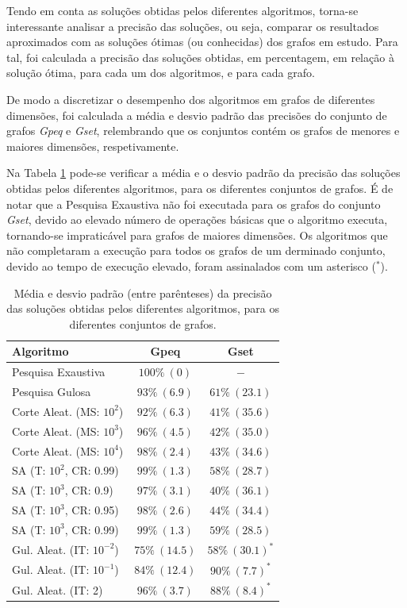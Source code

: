 \documentclass[mirror, portugues]{revdetua}
\begin{document}
Tendo em conta as soluções obtidas pelos diferentes algoritmos, torna-se interessante analisar a precisão das soluções, ou seja, comparar os resultados aproximados com as soluções ótimas (ou conhecidas) dos grafos em estudo. Para tal, foi calculada a precisão das soluções obtidas, em percentagem, em relação à solução ótima, para cada um dos algoritmos, e para cada grafo.

De modo a discretizar o desempenho dos algoritmos em grafos de diferentes dimensões, foi calculada a média e desvio padrão das precisões do conjunto de grafos \textit{Gpeq} e \textit{Gset}, relembrando que os conjuntos contém os grafos de menores e maiores dimensões, respetivamente.

Na Tabela \ref{table:precision} pode-se verificar a média e o desvio padrão da precisão das soluções obtidas pelos diferentes algoritmos, para os diferentes conjuntos de grafos. É de notar que a Pesquisa Exaustiva não foi executada para os grafos do conjunto \textit{Gset}, devido ao elevado número de operações básicas que o algoritmo executa, tornando-se impraticável para grafos de maiores dimensões. Os algoritmos que não completaram a execução para todos os grafos de um derminado conjunto, devido ao tempo de execução elevado, foram assinalados com um asterisco ($^*$).


\begin{table}[H]
\centering
\caption{Média e desvio padrão (entre parênteses) da precisão das soluções obtidas pelos diferentes algoritmos, para os diferentes conjuntos de grafos.}
\label{table:precision}
\begin{tabular}{lcc}
\toprule
\textbf{Algoritmo} & \textbf{Gpeq} & \textbf{Gset} \\
\midrule
Pesquisa Exaustiva & $100\% \ (0)$ & $-$ \\
Pesquisa Gulosa & $93\% \ (6.9)$ & $61\% \ (23.1)$ \\
Corte Aleat. (MS: $10^2$) & $92\% \ (6.3)$ & $41\% \ (35.6)$ \\
Corte Aleat. (MS: $10^3$) & $96\% \ (4.5)$ & $42\% \ (35.0)$ \\
Corte Aleat. (MS: $10^4$) & $98\% \ (2.4)$ & $43\% \ (34.6)$ \\
SA (T: $10^2$, CR: 0.99) & $99\% \ (1.3)$ & $58\% \ (28.7)$ \\
SA (T: $10^3$, CR: 0.9) & $97\% \ (3.1)$ & $40\% \ (36.1)$ \\
SA (T: $10^3$, CR: 0.95) & $98\% \ (2.6)$ & $44\% \ (34.4)$ \\
SA (T: $10^3$, CR: 0.99) & $99\% \ (1.3)$ & $59\% \ (28.5)$ \\
Gul. Aleat. (IT: $10^{-2}$) & $75\% \ (14.5)$ & $58\% \ (30.1)^*$\\
Gul. Aleat. (IT: $10^{-1}$) & $84\% \ (12.4)$ & $90\% \ (7.7)^*$\\
Gul. Aleat. (IT: 2) & $96\% \ (3.7)$ & $88\% \ (8.4)^*$ \\
\bottomrule
\end{tabular}
\end{table}
\end{document}
